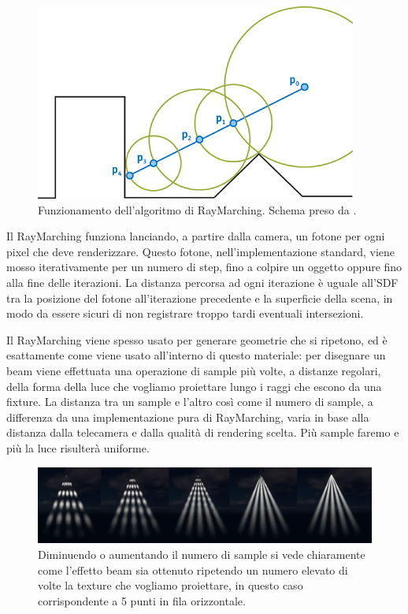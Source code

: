 \documentclass[main.tex]{subfiles}
\begin{document}
\begin{figure}
    \centering
    \captionsetup{justification=centering}
    \includegraphics[scale=0.65]{img/renderingPipeline/spheretrace.jpg}
    \caption{Funzionamento dell'algoritmo di RayMarching. Schema preso da \cite{fig_2_rayMarchSchema}.}
    \label{fig:2_raymarchWikipedia} %
\end{figure}
Il RayMarching funziona lanciando, a partire dalla camera, un fotone per ogni pixel che deve renderizzare. Questo fotone, nell'implementazione standard, viene mosso iterativamente per un numero di step, fino a colpire un oggetto oppure fino alla fine delle iterazioni. La distanza percorsa ad ogni iterazione è uguale all'SDF tra la posizione del fotone all'iterazione precedente e la superficie della scena, in modo da essere sicuri di non registrare troppo tardi eventuali intersezioni.\newline

Il RayMarching viene spesso usato per generare geometrie che si ripetono, ed è esattamente come viene usato all'interno di questo materiale: per disegnare un beam viene effettuata una operazione di sample più volte, a distanze regolari, della forma della luce che vogliamo proiettare lungo i raggi che escono da una fixture. La distanza tra un sample e l'altro così come il numero di sample, a differenza da una implementazione pura di RayMarching, varia in base alla distanza dalla telecamera e dalla qualità di rendering scelta. Più sample faremo e più la luce risulterà uniforme. 
\begin{figure}[H]
    \centering
    \includegraphics[width=1\linewidth]{img/renderingPipeline/renderingQuality.jpg}
    \caption{Diminuendo o aumentando il numero di sample si vede chiaramente come l'effetto beam sia ottenuto ripetendo un numero elevato di volte la texture che vogliamo proiettare, in questo caso corrispondente a 5 punti in fila orizzontale.}
    \label{fig:2_raymarchQualities}
\end{figure}
\end{document}
